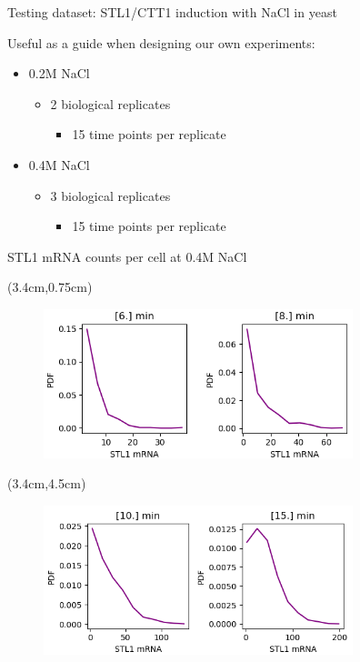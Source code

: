 \documentclass[aspectratio=1610]{beamer}					%
\begin{document}
\begin{frame}{Testing dataset: STL1/CTT1 induction with NaCl in yeast}

Useful as a guide when designing our own experiments:
\vspace{0.2in}

\begin{itemize}
\item 0.2M NaCl
\begin{itemize}
\item 2 biological replicates
\begin{itemize}
\item 15 time points per replicate
\end{itemize}
\end{itemize}
\item 0.4M NaCl
\begin{itemize}
\item 3 biological replicates
\begin{itemize}
\item 15 time points per replicate
\end{itemize}
\end{itemize}
\end{itemize}

\end{frame}

\begin{frame}{STL1 mRNA counts per cell at 0.4M NaCl}

\begin{textblock*}{5cm}(3.4cm,0.75cm)
\begin{figure}
\includegraphics[width=9cm]{count-hist-2.png}
\end{figure}
\end{textblock*}

\begin{textblock*}{5cm}(3.4cm,4.5cm)
\begin{figure}
\includegraphics[width=9cm]{count-hist-1.png}
\end{figure}
\end{textblock*}

\end{frame}
\end{document}
